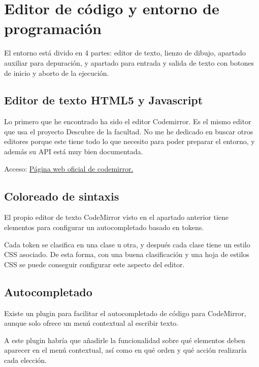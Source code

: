 \documentclass{report}
\begin{document}
	\section{Editor de código y entorno de programación}
	
	El entorno está divido en 4 partes: editor de texto, lienzo de dibujo, apartado auxiliar para depuración, y apartado para entrada y salida de texto con botones de inicio y aborto de la ejecución.
	
	\subsection{Editor de texto HTML5 y Javascript}
	
	Lo primero que he encontrado ha sido el editor Codemirror. Es el mismo editor que usa el proyecto Descubre de la facultad. No me he dedicado en buscar otros editores porque este tiene
	todo lo que necesito para poder preparar el entorno, y además su API está muy bien documentada\cite{codemirrorapi}.
	
	Acceso:
	\href{http://codemirror.net/}{Página web oficial de codemirror.}
	
	\subsection{Coloreado de sintaxis}
	
	El propio editor de texto CodeMirror visto en el apartado anterior tiene elementos para configurar un autocompletado basado en tokens. 
	
	\vspace{10px}
	
	Cada token se clasifica en una clase u otra, y después cada clase tiene un estilo CSS asociado. De esta forma, con una buena clasificación y una hoja de estilos CSS se puede conseguir configurar este aspecto del editor.
	
	\subsection{Autocompletado}
	
	Existe un plugin para facilitar el autocompletado de código para CodeMirror, aunque solo ofrece un menú contextual al escribir texto. 
	
	\vspace{10px}
	
	A este plugin habría que añadirle la funcionalidad sobre qué elementos deben aparecer en el menú contextual, así como en qué orden y qué acción realizaría cada elección.
	
\end{document}
